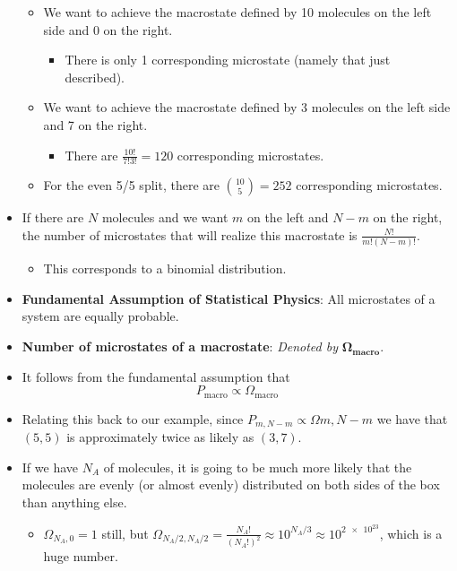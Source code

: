 \documentclass[../notes.tex]{subfiles}
\begin{document}
\begin{itemize}
\begin{itemize}
        \item We want to achieve the macrostate defined by 10 molecules on the left side and 0 on the right.
        \begin{itemize}
            \item There is only 1 corresponding microstate (namely that just described).
        \end{itemize}
        \item We want to achieve the macrostate defined by 3 molecules on the left side and 7 on the right.
        \begin{itemize}
            \item There are $\frac{10!}{7!3!}=120$ corresponding microstates.
        \end{itemize}
        \item For the even 5/5 split, there are $\binom{10}{5}=252$ corresponding microstates.
    \end{itemize}
    \item If there are $N$ molecules and we want $m$ on the left and $N-m$ on the right, the number of microstates that will realize this macrostate is $\frac{N!}{m!(N-m)!}$.
    \begin{itemize}
        \item This corresponds to a binomial distribution.
    \end{itemize}
    \item \textbf{Fundamental Assumption of Statistical Physics}: All microstates of a system are equally probable.
    \item \textbf{Number of microstates of a macrostate}: \emph{Denoted by} $\bm{\Omega_\textbf{macro}}$.
    \item It follows from the fundamental assumption that
    \begin{equation*}
        P_\text{macro} \propto \Omega_\text{macro}
    \end{equation*}
    \item Relating this back to our example, since $P_{m,N-m}\propto\Omega{m,N-m}$ we have that $(5,5)$ is approximately twice as likely as $(3,7)$.
    \item If we have $N_A$ of molecules, it is going to be much more likely that the molecules are evenly (or almost evenly) distributed on both sides of the box than anything else.
    \begin{itemize}
        \item $\Omega_{N_A,0}=1$ still, but $\Omega_{N_A/2,N_A/2}=\frac{N_A!}{(N_A!)^2}\approx 10^{N_A/3}\approx 10^{\num{2e23}}$, which is a huge number.

\end{itemize}
\end{itemize}
\end{document}
